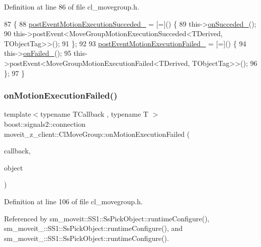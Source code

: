 Definition at line 86 of file cl\+\_\+movegroup.\+h.


\begin{DoxyCode}
87   \{
88     \hyperlink{classmoveit__z__client_1_1ClMoveGroup_a9234c0edadb1f173c31fc8fa5430afcd}{postEventMotionExecutionSucceded\_} = [=]() \{
89       this->\hyperlink{classmoveit__z__client_1_1ClMoveGroup_a77804970cc1e2ae64e26dabbf556352d}{onSucceded\_}();
90       this->postEvent<MoveGroupMotionExecutionSucceded<TDerived, TObjectTag>>();
91     \};
92 
93     \hyperlink{classmoveit__z__client_1_1ClMoveGroup_afecfdc1860dffea3331379b90d608154}{postEventMotionExecutionFailed\_} = [=]() \{
94       this->\hyperlink{classmoveit__z__client_1_1ClMoveGroup_ab9f19c609cfa111748bc16d497dffe9a}{onFailed\_}();
95       this->postEvent<MoveGroupMotionExecutionFailed<TDerived, TObjectTag>>();
96     \};
97   \}
\end{DoxyCode}
\mbox{\label{classmoveit__z__client_1_1ClMoveGroup_a1a80f1f29d5be0ff115cbedb8c80afd8}} 
\subsubsection{\texorpdfstring{on\+Motion\+Execution\+Failed()}{onMotionExecutionFailed()}}
{\footnotesize\ttfamily template$<$typename T\+Callback , typename T $>$ \\
boost\+::signals2\+::connection moveit\+\_\+z\+\_\+client\+::\+Cl\+Move\+Group\+::on\+Motion\+Execution\+Failed (\begin{DoxyParamCaption}\item[{T\+Callback}]{callback,  }\item[{T $\ast$}]{object }\end{DoxyParamCaption})\hspace{0.3cm}{\ttfamily [inline]}}



Definition at line 106 of file cl\+\_\+movegroup.\+h.



Referenced by sm\+\_\+moveit\+::\+S\+S1\+::\+Ss\+Pick\+Object\+::runtime\+Configure(), sm\+\_\+moveit\+\_\+::\+S\+S1\+::\+Ss\+Pick\+Object\+::runtime\+Configure(), and sm\+\_\+moveit\+\_\+::\+S\+S1\+::\+Ss\+Pick\+Object\+::runtime\+Configure().


